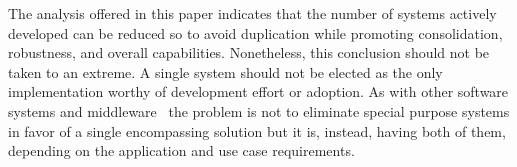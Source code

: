 \documentclass{sig-alternate}
\begin{document}



The analysis offered in this paper indicates that the number of \pilot systems
actively developed can be reduced so to avoid duplication while promoting
consolidation, robustness, and overall capabilities.  Nonetheless, this
conclusion should not be taken to an extreme. A single \pilot system should not
be elected as the only implementation worthy of development effort or adoption.
As with other software systems and middleware~\cite{bernstein1996} the problem
is not to eliminate special purpose systems in favor of a single encompassing
solution but it is, instead, having both of them, depending on the application
and use case requirements.
\end{document}
